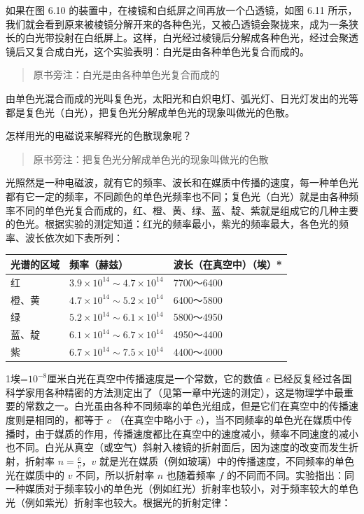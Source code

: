 如果在图 6.10 的装置中，在棱镜和白纸屏之间再放一个凸透镜，如图 6.11
所示，我们就会看到原来被棱镜分解开来的各种色光，又被凸透镜会聚拢来，成为一条狭长的白光带投射在白纸屏上。这样，白光经过棱镜后分解成各种色光，经过会聚透镜后又复合成白光，这个实验表明：白光是由各种单色光复合而成的。

\begin{quote}
原书旁注：白光是由各种单色光复合而成的
\end{quote}

由单色光混合而成的光叫复色光，太阳光和白炽电灯、弧光灯、日光灯发出的光等都是复色光（白光），把复色光分解成单色光的现象叫做光的色散。

怎样用光的电磁说来解释光的色散现象呢？

\begin{quote}
原书旁注：把复色光分解成单色光的现象叫做光的色散
\end{quote}

光照然是一种电磁波，就有它的频率、波长和在媒质中传播的速度，每一种单色光都有它一定的频率，不同颜色的单色光频率也不同；复色光（白光）就是由各种频率不同的单色光复合而成的，红、橙、黄、绿、蓝、靛、紫就是组成它的几种主要的色光。根据实验的测定知道：红光的频率最小，紫光的频率最大，各色光的频率、波长依次如下表所列：

{\def\LTcaptype{none} %
\begin{longtable}[]{@{}lll@{}}
\toprule\noalign{}
光谱的区域 & 频率（赫兹） & 波长（在真空中）（埃）* \\
\midrule\noalign{}
\endhead
\bottomrule\noalign{}
\endlastfoot
红 & \(3.9 \times 10^{14} \sim 4.7 \times 10^{14}\) & 7700～6400 \\
橙、黄 & \(4.7 \times 10^{14} \sim 5.2 \times 10^{14}\) & 6400～5800 \\
绿 & \(5.2\times10^{14}\sim6.1\times10^{14}\) & 5800～4950 \\
蓝、靛 & \(6.1 \times 10^{14} \sim 6.7 \times 10^{14}\) & 4950～4400 \\
紫 & \(6.7 \times 10^{14} \sim 7.5 \times 10^{14}\) & 4400～4000 \\
\end{longtable}
}

1埃=\(10^{-8}\)厘米白光在真空中传播速度是一个常数，它的数值 \(c\)
已经反复经过各国科学家用各种精密的方法测定出了（见第一章中光速的测定），这是物理学中最重要的常数之一。白光虽由各种不同频率的单色光组成，但是它们在真空中的传播速度则是相同的，都等于
\(c\) （在真空中略小于
\(c\)），当不同频率的单色光在媒质中传播时，由于媒质的作用，传播速度都比在真空中的速度减小，频率不同速度的减小也不同。白光从真空（或空气）斜射入棱镜的折射面后，因为速度的改变而发生折射，折射率
\(n = \frac{c}{v}\)，\(v\)
就是光在媒质（例如玻璃）中的传播速度，不同频率的单色光在媒质中的 \(v\)
不同，所以折射率 \(n\) 也随着频率 \(f\)
的不同而不同。实验指出：同一种媒质对于频率较小的单色光（例如红光）折射率也较小，对于频率较大的单色光（例如紫光）折射率也较大。根据光的折射定律：

